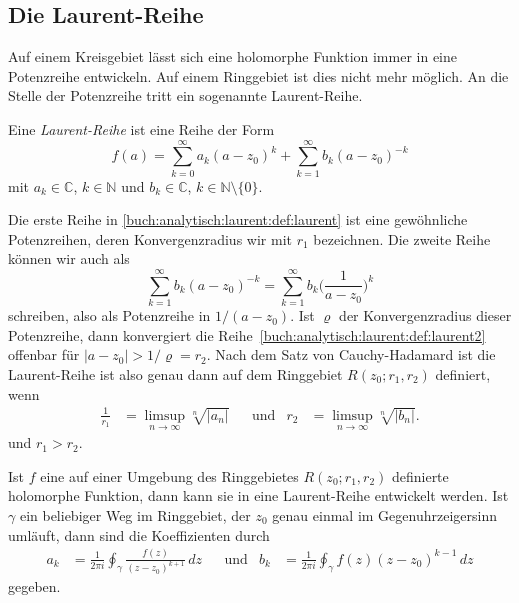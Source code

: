%
%
%
\subsection{Die Laurent-Reihe}
Auf einem Kreisgebiet lässt sich eine holomorphe Funktion immer in eine
Potenzreihe entwickeln.
Auf einem Ringgebiet ist dies nicht mehr möglich.
An die Stelle der Potenzreihe tritt ein sogenannte Laurent-Reihe.

\begin{definition}
\label{buch:analytisch:laurent:def:laurentreihe}
Eine \emph{Laurent-Reihe} ist eine Reihe der Form
%
\begin{equation}
f(a)
=
\sum_{k=0}^\infty a_k(a-z_0)^k
+
\sum_{k=1}^\infty b_k(a-z_0)^{-k}
\label{buch:analytisch:laurent:def:laurent}
\end{equation}
mit $a_k\in\mathbb{C}$, $k\in\mathbb{N}$ und $b_k\in\mathbb{C}$,
$k\in\mathbb{N}\setminus\{0\}$.
\end{definition}

Die erste Reihe in
\eqref{buch:analytisch:laurent:def:laurent}
ist eine gewöhnliche Potenzreihen, deren Konvergenzradius wir mit $r_1$
bezeichnen.
Die zweite Reihe können wir auch als
\begin{equation}
\sum_{k=1}^\infty b_k(a-z_0)^{-k}
=
\sum_{k=1}^\infty b_k\biggl(\frac{1}{a-z_0}\biggr)^{k}
\label{buch:analytisch:laurent:def:laurent2}
\end{equation}
schreiben, also als Potenzreihe in $1/(a-z_0)$.
Ist $\varrho$ der Konvergenzradius dieser Potenzreihe, dann konvergiert
die Reihe~\eqref{buch:analytisch:laurent:def:laurent2}
offenbar für $|a-z_0| > 1/\varrho = r_2$.
Nach dem Satz von Cauchy-Hadamard ist die Laurent-Reihe ist also genau
dann auf dem Ringgebiet $R(z_0;r_1,r_2)$ definiert, wenn 
\begin{align*}
\frac{1}{r_1}
&=
\limsup_{n\to\infty}\!\sqrt[n]{|a_n|}
&&\text{und}&
r_2
&=
\limsup_{n\to\infty}\!\sqrt[n]{|b_n|}.
\end{align*}
und $r_1 > r_2$.

\begin{satz}
\label{buch:analytisch:laurent:satz:laurentreihe}
Ist $f$ eine auf einer Umgebung des Ringgebietes $R(z_0;r_1,r_2)$ definierte
holomorphe Funktion, dann kann sie in eine Laurent-Reihe entwickelt werden.
Ist $\gamma$ ein beliebiger Weg im Ringgebiet, der $z_0$ genau einmal
im Gegenuhrzeigersinn umläuft, dann sind die 
Koeffizienten durch
\begin{align}
a_k
&=
\frac{1}{2\pi i}
\oint_{\gamma} 
\frac{f(z)}{(z-z_0)^{k+1}}
\,dz
&&\text{und}&
b_k
&=
\frac{1}{2\pi i}
\oint_{\gamma} 
f(z)(z-z_0)^{k-1}
\,dz
\label{buch:analytisch:laurent:eqn:laurentkoeffizienten}
\end{align}
gegeben.
\end{satz}

